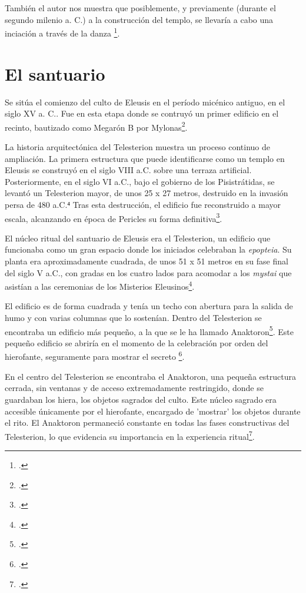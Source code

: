 También el autor nos muestra que posiblemente, y previamente (durante el segundo milenio a. C.) a la construcción del templo, se llevaría a cabo una inciación a través de la danza \footcite[48]{kerenyiEleusisImagenArquetipica2004}. 

\section{El santuario}

Se sitúa el comienzo del culto de Eleusis en el período micénico antiguo, en el siglo XV a. C.. Fue en esta etapa donde se contruyó un primer edificio en el recinto, bautizado como Megarón B por Mylonas\footcite[136]{mylonasEleusisEleusinianMysteries1947}. 

La historia arquitectónica del Telesterion muestra un proceso continuo de ampliación. La primera estructura que puede identificarse como un templo en Eleusis se construyó en el siglo VIII a.C. sobre una terraza artificial. Posteriormente, en el siglo VI a.C., bajo el gobierno de los Pisistrátidas, se levantó un Telesterion mayor, de unos 25 x 27 metros, destruido en la invasión persa de 480 a.C.⁴ Tras esta destrucción, el edificio fue reconstruido a mayor escala, alcanzando en época de Pericles su forma definitiva\footcite[235]{a.evansSanctuariesSacrificesEleusinian2002}.

El núcleo ritual del santuario de Eleusis era el Telesterion, un edificio que funcionaba como un gran espacio donde los iniciados celebraban la \textit{epopteia}. Su planta era aproximadamente cuadrada, de unos 51 x 51 metros en su fase final del siglo V a.C., con gradas en los cuatro lados para acomodar a los \textit{mystai }que asistían a las ceremonias de los Misterios Eleusinos\footcite[233-235]{a.evansSanctuariesSacrificesEleusinian2002}.

El edificio es de forma cuadrada y tenía un techo con abertura para la salida de humo y con varias columnas que lo sostenían. Dentro del Telesterion se encontraba un edificio más pequeño, a la que se le ha llamado Anaktoron\footcite[45]{bowdenMysteryCultsAncient2023}. Este pequeño edificio se abriría en el momento de la celebración por orden del hierofante, seguramente para mostrar el secreto  \footcite[111]{kerenyiEleusisImagenArquetipica2004}. 

En el centro del Telesterion se encontraba el Anaktoron, una pequeña estructura cerrada, sin ventanas y de acceso extremadamente restringido, donde se guardaban los hiera, los objetos sagrados del culto. Este núcleo sagrado era accesible únicamente por el hierofante, encargado de 'mostrar' los objetos durante el rito. El Anaktoron permaneció constante en todas las fases constructivas del Telesterion, lo que evidencia su importancia en la experiencia ritual\footcite[234-235]{a.evansSanctuariesSacrificesEleusinian2002}.

